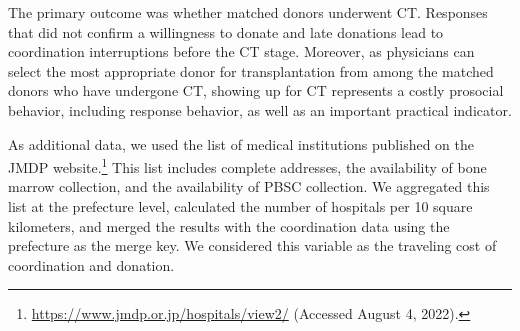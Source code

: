 \documentclass[12pt, a4paper]{article}
\begin{document}
The primary outcome was whether matched donors underwent CT. Responses that did not confirm a willingness to donate and late donations lead to coordination interruptions before the CT stage. Moreover, as physicians can select the most appropriate donor for transplantation from among the matched donors who have undergone CT, showing up for CT represents a costly prosocial behavior, including response behavior, as well as an important practical indicator.

As additional data, we used the list of medical institutions published on the JMDP website.\footnote{\url{https://www.jmdp.or.jp/hospitals/view2/} (Accessed August 4, 2022).} This list includes complete addresses, the availability of bone marrow collection, and the availability of PBSC collection. We aggregated this list at the prefecture level, calculated the number of hospitals per 10 square kilometers, and merged the results with the coordination data using the prefecture as the merge key. We considered this variable as the traveling cost of coordination and donation.
\end{document}
